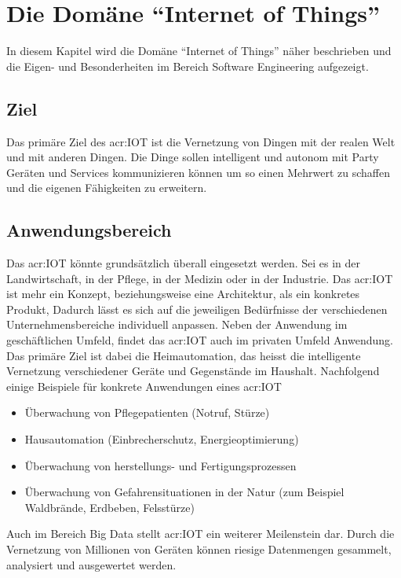\chapter{Die Domäne "`Internet of Things"'}
In diesem Kapitel wird die Domäne "`Internet of Things"' näher beschrieben und die Eigen- und Besonderheiten im Bereich Software Engineering aufgezeigt.



\section{Ziel}
Das primäre Ziel des \gls{acr:IOT} ist die Vernetzung von Dingen mit der realen Welt und mit anderen Dingen. Die Dinge sollen intelligent und autonom mit Party Geräten und Services kommunizieren können um so einen Mehrwert zu schaffen und die eigenen Fähigkeiten zu erweitern. 



\section{Anwendungsbereich}
Das \gls{acr:IOT} könnte grundsätzlich überall eingesetzt werden. Sei es in der Landwirtschaft, in der Pflege, in der Medizin oder in der Industrie. Das \gls{acr:IOT} ist mehr ein Konzept, beziehungsweise eine Architektur, als ein konkretes Produkt, Dadurch lässt es sich auf die jeweiligen Bedürfnisse der verschiedenen Unternehmensbereiche individuell anpassen. Neben der Anwendung im geschäftlichen Umfeld, findet das \gls{acr:IOT} auch im privaten Umfeld Anwendung. Das primäre Ziel ist dabei die Heimautomation, das heisst die intelligente Vernetzung verschiedener Geräte und Gegenstände im Haushalt. Nachfolgend einige Beispiele für konkrete Anwendungen eines \gls{acr:IOT}


\begin{itemize}
\item Überwachung von Pflegepatienten (Notruf, Stürze)
\item Hausautomation (Einbrecherschutz, Energieoptimierung)
\item Überwachung von herstellungs- und Fertigungsprozessen
\item Überwachung von Gefahrensituationen in der Natur (zum Beispiel Waldbrände, Erdbeben, Felsstürze)
\end{itemize}

Auch im Bereich Big Data stellt \gls{acr:IOT} ein weiterer Meilenstein dar. Durch die Vernetzung von Millionen von Geräten können riesige Datenmengen gesammelt, analysiert und ausgewertet werden.



